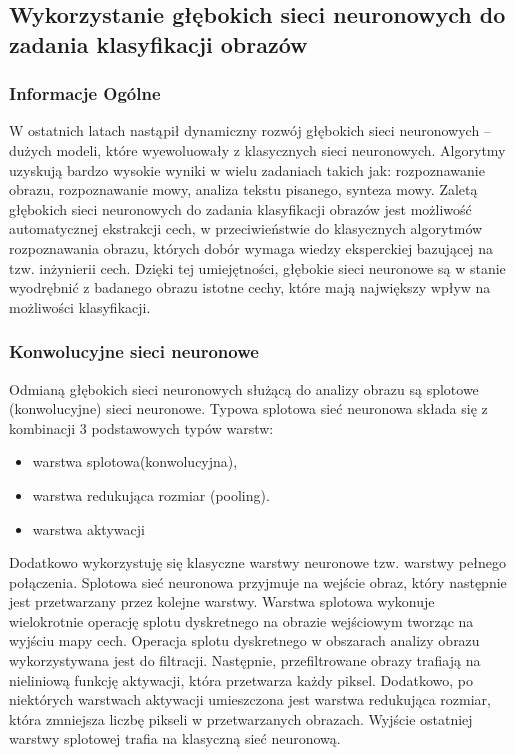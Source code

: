\subsection{Wykorzystanie głębokich sieci neuronowych do zadania klasyfikacji obrazów}

\subsubsection{Informacje Ogólne}

W ostatnich latach nastąpił dynamiczny rozwój głębokich sieci neuronowych – dużych modeli, które wyewoluowały z klasycznych sieci neuronowych. Algorytmy uzyskują bardzo wysokie wyniki w wielu zadaniach takich jak: rozpoznawanie obrazu, rozpoznawanie mowy, analiza tekstu pisanego, synteza mowy. Zaletą głębokich sieci neuronowych do zadania klasyfikacji obrazów jest możliwość automatycznej ekstrakcji cech, w przeciwieństwie do klasycznych algorytmów rozpoznawania obrazu, których dobór wymaga wiedzy eksperckiej bazującej na tzw. inżynierii cech. Dzięki tej umiejętności, głębokie sieci neuronowe są w stanie wyodrębnić z badanego obrazu istotne cechy, które mają największy wpływ na możliwości klasyfikacji. 

\subsubsection{Konwolucyjne sieci neuronowe}

Odmianą głębokich sieci neuronowych służącą do analizy obrazu są splotowe (konwolucyjne) sieci neuronowe. Typowa splotowa sieć neuronowa składa się z kombinacji 3 podstawowych typów warstw: 
\begin{itemize}	
	\item warstwa splotowa(konwolucyjna), 
	\item warstwa redukująca rozmiar (pooling). 
	\item warstwa aktywacji \\
\end{itemize}	

Dodatkowo wykorzystuję się klasyczne warstwy neuronowe tzw. warstwy pełnego połączenia. Splotowa sieć neuronowa przyjmuje na wejście obraz, który następnie jest przetwarzany przez kolejne warstwy. Warstwa splotowa wykonuje wielokrotnie operację splotu dyskretnego na obrazie wejściowym tworząc na wyjściu mapy cech. Operacja splotu dyskretnego w obszarach analizy obrazu wykorzystywana jest do filtracji. Następnie, przefiltrowane obrazy trafiają na nieliniową funkcję aktywacji, która przetwarza każdy piksel. Dodatkowo, po niektórych warstwach aktywacji umieszczona jest warstwa redukująca rozmiar, która zmniejsza liczbę pikseli w przetwarzanych obrazach. Wyjście ostatniej warstwy splotowej trafia na klasyczną sieć neuronową. \\

